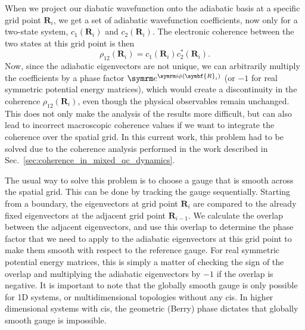 When we project our diabatic wavefunction onto the adiabatic basis at a specific grid point $\symbf{R}_i$, we get a set of adiabatic wavefunction coefficients, now only for a two-state system, $c_1(\symbf{R}_i)$ and $c_2(\symbf{R}_i)$. The electronic coherence between the two states at this grid point is then
\begin{equation}
\rho_{12}(\symbf{R}_i)=c_1(\symbf{R}_i)c_2^\ast(\symbf{R}_i).
\end{equation}
Now, since the adiabatic eigenvectors are not unique, we can arbitrarily multiply the coefficients by a phase factor $\e^{\i\phi(\symbf{R}_i)}$ (or $-1$ for real symmetric potential energy matrices), which would create a discontinuity in the coherence $\rho_{12}(\symbf{R}_i)$, even though the physical observables remain unchanged. This does not only make the analysis of the results more difficult, but can also lead to incorrect macroscopic coherence values if we want to integrate the coherence over the spatial grid. In this current work, this problem had to be solved due to the coherence analysis performed in the work described in Sec.~\ref{sec:coherence_in_mixed_qc_dynamics}.

The usual way to solve this problem is to choose a gauge that is smooth across the spatial grid. This can be done by tracking the gauge sequentially. Starting from a boundary, the eigenvectors at grid point $\symbf{R}_i$ are compared to the already fixed eigenvectors at the adjacent grid point $\symbf{R}_{i−1}$. We calculate the overlap between the adjacent eigenvectors, and use this overlap to determine the phase factor that we need to apply to the adiabatic eigenvectors at this grid point to make them smooth with respect to the reference gauge. For real symmetric potential energy matrices, this is simply a matter of checking the sign of the overlap and multiplying the adiabatic eigenvectors by $-1$ if the overlap is negative. It is important to note that the globally smooth gauge is only possible for 1D systems, or multidimensional topologies without any \glspl{ci}. In higher dimensional systems with \glspl{ci}, the geometric (Berry) phase dictates that globally smooth gauge is impossible.

